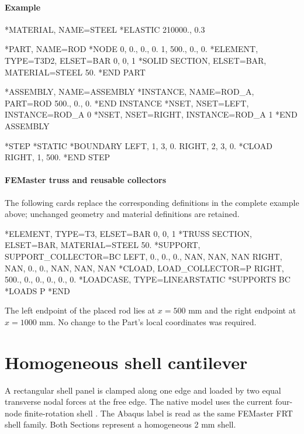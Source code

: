 \paragraph*{Example}

\begin{inputdeck}
*MATERIAL, NAME=STEEL
*ELASTIC
210000., 0.3

*PART, NAME=ROD
*NODE
0,   0., 0., 0.
1, 500., 0., 0.
*ELEMENT, TYPE=T3D2, ELSET=BAR
0, 0, 1
*SOLID SECTION, ELSET=BAR,
 MATERIAL=STEEL
50.
*END PART

*ASSEMBLY, NAME=ASSEMBLY
*INSTANCE, NAME=ROD_A, PART=ROD
500., 0., 0.
*END INSTANCE
*NSET, NSET=LEFT, INSTANCE=ROD_A
0
*NSET, NSET=RIGHT, INSTANCE=ROD_A
1
*END ASSEMBLY

*STEP
*STATIC
*BOUNDARY
LEFT, 1, 3, 0.
RIGHT, 2, 3, 0.
*CLOAD
RIGHT, 1, 500.
*END STEP
\end{inputdeck}

\paragraph*{FEMaster truss and reusable collectors}

The following cards replace the corresponding definitions in the
complete example above; unchanged geometry and material definitions
are retained.

\begin{inputdeck}
*ELEMENT, TYPE=T3, ELSET=BAR
0, 0, 1
*TRUSS SECTION, ELSET=BAR, MATERIAL=STEEL
50.
*SUPPORT, SUPPORT_COLLECTOR=BC
LEFT, 0., 0., 0., NAN, NAN, NAN
RIGHT, NAN, 0., 0., NAN, NAN, NAN
*CLOAD, LOAD_COLLECTOR=P
RIGHT, 500., 0., 0., 0., 0., 0.
*LOADCASE, TYPE=LINEARSTATIC
*SUPPORTS
BC
*LOADS
P
*END
\end{inputdeck}

The left endpoint of the placed rod lies at \(x=500\) mm and the right endpoint at \(x=1000\) mm. No change to the Part's local coordinates was required.

\section{Homogeneous shell cantilever}

A rectangular shell panel is clamped along one edge and loaded by two equal transverse nodal forces at the free edge. The native model uses the current four-node finite-rotation shell . The Abaqus label  is read as the same FEMaster FRT shell family. Both Sections represent a homogeneous 2 mm shell.

